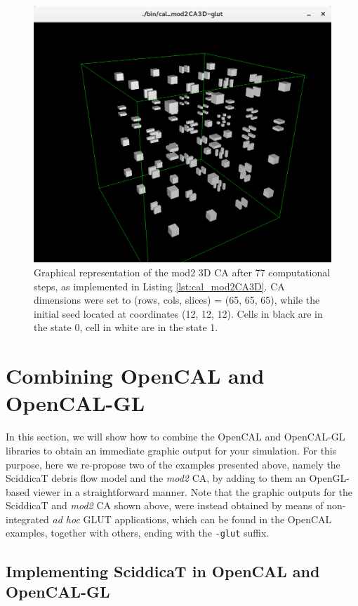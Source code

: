 \begin{figure}
  \begin{center}
    \includegraphics[width=12cm]{./images/OpenCAL/mod23DCA-glut}
    \caption{Graphical representation of the mod2 3D CA after 77 computational steps, as implemented in Listing \ref{lst:cal_mod2CA3D}. CA dimensions were set to (rows, cols, slices) = (65, 65, 65), while the initial seed located at coordinates (12, 12, 12). Cells in black are in the state 0, cell in white are in the state 1.}
    \label{fig:cal_mod2CA3D}
  \end{center}
\end{figure}


\section{Combining OpenCAL and OpenCAL-GL}\label{sec:combining_gl}

In this section, we will show how to combine the OpenCAL and
OpenCAL-GL libraries to obtain an immediate graphic output for your
simulation. For this purpose, here we re-propose two of the examples
presented above, namely the SciddicaT debris flow model and the
\emph{mod2} CA, by adding to them an OpenGL-based viewer in a
straightforward manner. Note that the graphic outputs for the
SciddicaT and \emph{mod2} CA shown above, were instead obtained by
means of non-integrated \emph{ad hoc} GLUT applications, which can be
found in the OpenCAL examples, together with others, ending with the
\verb'-glut' suffix.

\subsection{Implementing SciddicaT in OpenCAL and OpenCAL-GL}\label{sec:calgl_sciddicaT}

